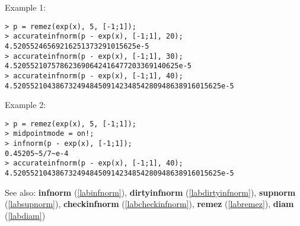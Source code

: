 \noindent Example 1: 
\begin{center}\begin{minipage}{15cm}\begin{Verbatim}[frame=single]
> p = remez(exp(x), 5, [-1;1]);
> accurateinfnorm(p - exp(x), [-1;1], 20);
4.52055246569216251373291015625e-5
> accurateinfnorm(p - exp(x), [-1;1], 30);
4.520552107578623690642416477203369140625e-5
> accurateinfnorm(p - exp(x), [-1;1], 40);
4.5205521043867324948450914234854280948638916015625e-5
\end{Verbatim}
\end{minipage}\end{center}
\noindent Example 2: 
\begin{center}\begin{minipage}{15cm}\begin{Verbatim}[frame=single]
> p = remez(exp(x), 5, [-1;1]);
> midpointmode = on!;
> infnorm(p - exp(x), [-1;1]);
0.45205~5/7~e-4
> accurateinfnorm(p - exp(x), [-1;1], 40);
4.5205521043867324948450914234854280948638916015625e-5
\end{Verbatim}
\end{minipage}\end{center}
See also: \textbf{infnorm} (\ref{labinfnorm}), \textbf{dirtyinfnorm} (\ref{labdirtyinfnorm}), \textbf{supnorm} (\ref{labsupnorm}), \textbf{checkinfnorm} (\ref{labcheckinfnorm}), \textbf{remez} (\ref{labremez}), \textbf{diam} (\ref{labdiam})
